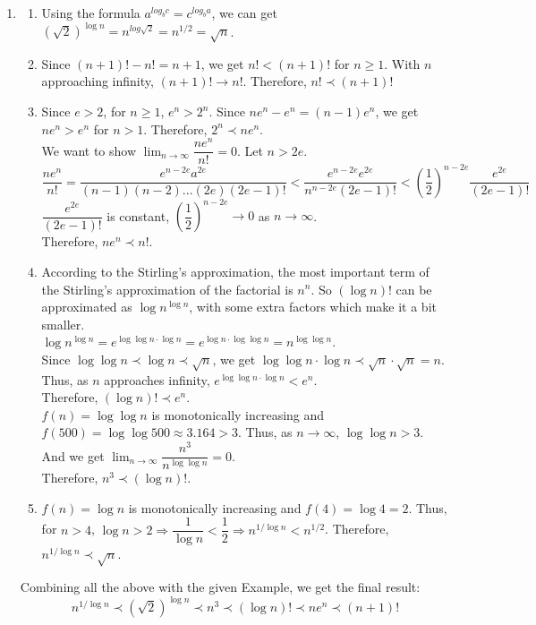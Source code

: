 \documentclass[12pt,a4paper]{article}
\makeatletter
\newtheorem*{solution}{Solution}
\theoremstyle{definition}
\renewenvironment{solution}[1][Solution] {\par\pushQED{\qed}\normalfont\topsep6\p@\@plus6\p@\relax\trivlist\item[\hskip\labelsep\bfseries#1\@addpunct{.}]\ignorespaces}{\popQED\endtrivlist\@endpefalse} \makeatother
\makeatother
\begin{document}
\begin{enumerate}
\begin{solution}
\begin{enumerate}
\item
Using the formula $a^{log_{b}c}=c^{log_{b}a}$, we can get $(\sqrt{2})^{\log n}=n^{log\sqrt{2}}=n^{1/2}=\sqrt{n}$.
\item
Since $(n+1)!-n!=n+1$, we get $n! < (n+1)!$ for $n\geq 1$. With $n$ approaching infinity, $(n+1)!\rightarrow n!$. Therefore, $n! \prec (n+1)!$
\item
Since $e>2$, for $n\geq 1$, $e^n>2^n$. Since $ne^n-e^n=(n-1)e^n$, we get $ne^n>e^n$ for $n>1$. Therefore, $2^n\prec ne^n$.\\
We want to show $\lim_{n\rightarrow\infty}\dfrac{ne^n}{n!}=0$. Let $n>2e$.\\
$\dfrac{ne^n}{n!}=\dfrac{e^{n-2e}a^{2e}}{(n-1)(n-2)...(2e)(2e-1)!}<\dfrac{e^{n-2e}e^{2e}}{n^{n-2e}(2e-1)!}<\left(\dfrac{1}{2}\right)^{n-2e}\dfrac{e^{2e}}{(2e-1)!}$\\
$\dfrac{e^{2e}}{(2e-1)!}$ is constant, $\left(\dfrac{1}{2}\right)^{n-2e}\rightarrow 0$ as $n\rightarrow\infty$.\\
Therefore, $ne^n\prec n!$.
\item
According to the Stirling's approximation, the most important term of the Stirling's approximation of the factorial is $n^n$. So $(\log n)!$ can be approximated as $\log n^{\log n}$, with some extra factors which make it a bit smaller.\\
$\log n^{\log n}=e^{\log\log n\cdot\log n}=e^{\log n\cdot\log\log n}=n^{\log \log n}$.\\
Since $\log \log n \prec \log n \prec \sqrt{n}$, we get $\log \log n \cdot \log n \prec \sqrt{n}\cdot\sqrt{n}=n$. Thus, as $n$ approaches infinity, $e^{\log \log n \cdot \log n}<e^n$.\\
Therefore, $(\log n)!\prec e^n$.\\
$f(n)=\log\log n$ is monotonically increasing and $f(500)=\log\log 500\approx3.164>3$. Thus, as $n\rightarrow\infty$, $\log\log n>3$. And we get $\lim_{n\rightarrow\infty}\dfrac{n^3}{n^{\log\log n}}=0$.\\
Therefore, $n^3\prec(\log n)!$.\\
\item
$f(n)=\log n$ is monotonically increasing and $f(4)=\log 4=2$. Thus, for $n>4$, $\log n>2\Rightarrow\dfrac{1}{\log n}<\dfrac{1}{2}\Rightarrow n^{1/\log n}<n^{1/2}$. Therefore, $n^{1/\log n}\prec\sqrt{n}$.
\end{enumerate}
Combining all the above with the given Example, we get the final result:$$n^{1/\log n}\prec(\sqrt{2})^{\log n}\prec n^3\prec (\log n)!\prec ne^n\prec (n+1)!$$

\end{solution}
\end{enumerate}
\end{document}
